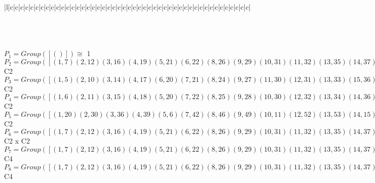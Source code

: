 \documentclass[varwidth=\maxdimen,border=10]{standalone}
\begin{document}
\begin{tabular}
\begin{array}{|l|c|c|c|c|c|c|c|c|c|c|c|c|c|c|c|c|c|c|c|c|c|c|c|c|c|c|c|c|c|c|c|c|c|c|c|c|c|c|c|c|c|c|c|c|c|c|c|}
\end{array}\)\\
\ \\
\ \\
$P_{1} = Group( [ () ] )\cong$ 1\ \\
$P_{2} = Group( [ ( 1, 7)( 2,12)( 3,16)( 4,19)( 5,21)( 6,22)( 8,26)( 9,29)(10,31)(11,32)(13,35)(14,37)(15,38)(17,40)(18,41)(20,42)(23,45)(24,47)(25,48)(27,50)(28,51)(30,52)(33,54)(34,55)(36,56)(39,57)(43,59)(44,60)(46,61)(49,62)(53,63)(58,64) ] )\cong$ C2\ \\
$P_{3} = Group( [ ( 1, 5)( 2,10)( 3,14)( 4,17)( 6,20)( 7,21)( 8,24)( 9,27)(11,30)(12,31)(13,33)(15,36)(16,37)(18,39)(19,40)(22,42)(23,43)(25,46)(26,47)(28,49)(29,50)(32,52)(34,53)(35,54)(38,56)(41,57)(44,58)(45,59)(48,61)(51,62)(55,63)(60,64) ] )\cong$ C2\ \\
$P_{4} = Group( [ ( 1, 6)( 2,11)( 3,15)( 4,18)( 5,20)( 7,22)( 8,25)( 9,28)(10,30)(12,32)(13,34)(14,36)(16,38)(17,39)(19,41)(21,42)(23,44)(24,46)(26,48)(27,49)(29,51)(31,52)(33,53)(35,55)(37,56)(40,57)(43,58)(45,60)(47,61)(50,62)(54,63)(59,64) ] )\cong$ C2\ \\
$P_{5} = Group( [ ( 1,20)( 2,30)( 3,36)( 4,39)( 5, 6)( 7,42)( 8,46)( 9,49)(10,11)(12,52)(13,53)(14,15)(16,56)(17,18)(19,57)(21,22)(23,58)(24,25)(26,61)(27,28)(29,62)(31,32)(33,34)(35,63)(37,38)(40,41)(43,44)(45,64)(47,48)(50,51)(54,55)(59,60) ] )\cong$ C2\ \\
$P_{6} = Group( [ ( 1, 7)( 2,12)( 3,16)( 4,19)( 5,21)( 6,22)( 8,26)( 9,29)(10,31)(11,32)(13,35)(14,37)(15,38)(17,40)(18,41)(20,42)(23,45)(24,47)(25,48)(27,50)(28,51)(30,52)(33,54)(34,55)(36,56)(39,57)(43,59)(44,60)(46,61)(49,62)(53,63)(58,64), ( 1, 5)( 2,10)( 3,14)( 4,17)( 6,20)( 7,21)( 8,24)( 9,27)(11,30)(12,31)(13,33)(15,36)(16,37)(18,39)(19,40)(22,42)(23,43)(25,46)(26,47)(28,49)(29,50)(32,52)(34,53)(35,54)(38,56)(41,57)(44,58)(45,59)(48,61)(51,62)(55,63)(60,64) ] )\cong$ C2 x C2\ \\
$P_{7} = Group( [ ( 1, 7)( 2,12)( 3,16)( 4,19)( 5,21)( 6,22)( 8,26)( 9,29)(10,31)(11,32)(13,35)(14,37)(15,38)(17,40)(18,41)(20,42)(23,45)(24,47)(25,48)(27,50)(28,51)(30,52)(33,54)(34,55)(36,56)(39,57)(43,59)(44,60)(46,61)(49,62)(53,63)(58,64), ( 1,19, 7, 4)( 2,29,12, 9)( 3,35,16,13)( 5,40,21,17)( 6,41,22,18)( 8,45,26,23)(10,50,31,27)(11,51,32,28)(14,54,37,33)(15,55,38,34)(20,57,42,39)(24,59,47,43)(25,60,48,44)(30,62,52,49)(36,63,56,53)(46,64,61,58) ] )\cong$ C4\ \\
$P_{8} = Group( [ ( 1, 7)( 2,12)( 3,16)( 4,19)( 5,21)( 6,22)( 8,26)( 9,29)(10,31)(11,32)(13,35)(14,37)(15,38)(17,40)(18,41)(20,42)(23,45)(24,47)(25,48)(27,50)(28,51)(30,52)(33,54)(34,55)(36,56)(39,57)(43,59)(44,60)(46,61)(49,62)(53,63)(58,64), ( 1,40, 7,17)( 2,50,12,27)( 3,54,16,33)( 4, 5,19,21)( 6,57,22,39)( 8,59,26,43)( 9,10,29,31)(11,62,32,49)(13,14,35,37)(15,63,38,53)(18,20,41,42)(23,24,45,47)(25,64,48,58)(28,30,51,52)(34,36,55,56)(44,46,60,61) ] )\cong$ C4\ \\

\end{tabular}
\end{document}
